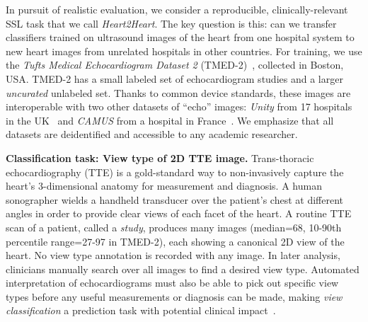 



In pursuit of realistic evaluation, we consider a reproducible, clinically-relevant SSL task that we call \emph{Heart2Heart}.
The key question is this: can we transfer classifiers trained on ultrasound images of the heart from one hospital system to new heart images from unrelated hospitals in other countries.
For training, we use the \emph{Tufts Medical Echocardiogram Dataset 2} (TMED-2)~\citep{huangTMEDDatasetSemiSupervised2022,huangNewSemisupervisedLearning2021}, collected in Boston, USA.
TMED-2 has a small labeled set of echocardiogram studies and a larger \emph{uncurated} unlabeled set.
Thanks to common device standards, these images are interoperable with two other datasets of ``echo'' images: \emph{Unity} from 17 hospitals in the UK~\citep{howardAutomatedLeftVentricular2021} and \emph{CAMUS} from a hospital in France~\citep{leclercDeepLearningSegmentation2019}.
We emphasize that all datasets are deidentified and accessible to any academic researcher.


\textbf{Classification task: View type of 2D TTE image.}
Trans-thoracic echocardiography (TTE) is a gold-standard way to non-invasively capture the heart's 3-dimensional anatomy for measurement and diagnosis.
A human sonographer wields a handheld transducer over the patient’s chest at different angles in order to provide clear views of each facet of the heart.
A routine TTE scan of a patient, called a \emph{study}, produces many images (median=68, 10-90th percentile range=27-97 in TMED-2), each showing a canonical 2D view of the heart.
No view type annotation is recorded with any image.
In later analysis, clinicians manually search over all images to find a desired view type.
Automated interpretation of echocardiograms must also be able to pick out specific view types before any useful measurements or diagnosis can be made, making \emph{view classification} a prediction task with potential clinical impact~\citep{madaniFastAccurateView2018,huangNewSemisupervisedLearning2021}.


